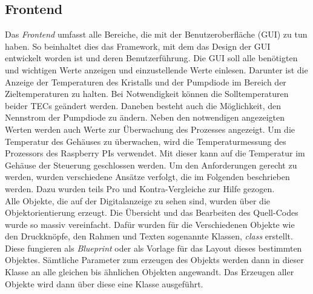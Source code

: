 \subsection{Frontend}
Das \textit{Frontend} umfasst alle Bereiche, die mit der Benutzeroberfläche (GUI) zu tun haben. So beinhaltet dies das Framework, mit dem das Design der GUI entwickelt worden ist und deren Benutzerführung. 
Die GUI soll alle benötigten und wichtigen Werte anzeigen und einzustellende Werte einlesen. Darunter ist die Anzeige der Temperaturen des Kristalls und der Pumpdiode im Bereich der Zieltemperaturen zu halten. Bei Notwendigkeit können die Solltemperaturen beider TECs geändert werden. Daneben besteht auch die Möglichkeit, den Nennstrom der Pumpdiode zu ändern. Neben den notwendigen angezeigten Werten werden auch Werte zur Überwachung des Prozesses angezeigt. Um die Temperatur des Gehäuses zu überwachen, wird die Temperaturmessung des Prozessors des Raspberry PIs verwendet. Mit dieser kann auf die Temperatur im Gehäuse der Steuerung geschlossen werden. Um den Anforderungen gerecht zu werden, wurden verschiedene Ansätze verfolgt, die im Folgenden beschrieben werden. Dazu wurden teils Pro und Kontra-Vergleiche zur Hilfe gezogen.\\

Alle Objekte, die auf der Digitalanzeige zu sehen sind, wurden über die Objektorientierung erzeugt. Die Übersicht und das Bearbeiten des Quell-Codes wurde so massiv vereinfacht. Dafür wurden für die Verschiedenen Objekte wie den Druckknöpfe, den Rahmen und Texten sogenannte Klassen, \textit{class} erstellt. Diese fungieren als \textit{Blueprint} oder als Vorlage für das Layout dieses bestimmten Objektes. Sämtliche Parameter zum erzeugen des Objekts werden dann in dieser Klasse an alle gleichen bis ähnlichen Objekten angewandt. Das Erzeugen aller Objekte wird dann über diese eine Klasse ausgeführt.

